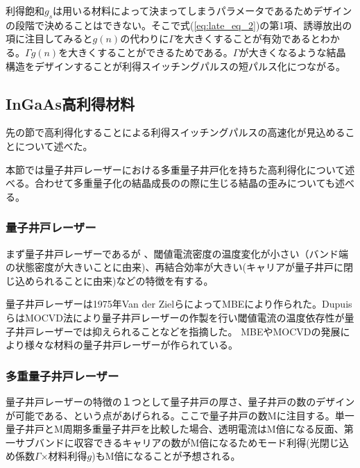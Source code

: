 利得飽和$g_{s}$は用いる材料によって決まってしまうパラメータであるためデザインの段階で決めることはできない。そこで式(\ref{eq:late_eq_2})の第1項、誘導放出の項に注目してみると$g(n)$の代わりに$\Gamma$を大きくすることが有効であるとわかる。$\Gamma g(n)$を大きくすることができるためである。$\Gamma$が大きくなるような結晶構造をデザインすることが利得スイッチングパルスの短パルス化につながる。
\clearpage
\subsection{InGaAs高利得材料}
先の節で高利得化することによる利得スイッチングパルスの高速化が見込めることについて述べた。

本節では量子井戸レーザーにおける多重量子井戸化を持ちた高利得化について述べる。合わせて多重量子化の結晶成長のの際に生じる結晶の歪みについても述べる。
\subsubsection{量子井戸レーザー}
まず量子井戸レーザーであるが
、閾値電流密度の温度変化が小さい（バンド端の状態密度が大きいことに由来)、再結合効率が大きい(キャリアが量子井戸に閉じ込められることに由来)などの特徴を有する。


量子井戸レーザーは1975年Van der ZielらによってMBEにより作られた\cite{ref_van}。DupuisらはMOCVD法により量子井戸レーザーの作製を行い閾値電流の温度依存性が量子井戸レーザーでは抑えられることなどを指摘した\cite{ref_dupuis}。%
MBEやMOCVDの発展により様々な材料の量子井戸レーザーが作られている。
\subsubsection{多重量子井戸レーザー}
量子井戸レーザーの特徴の１つとして量子井戸の厚さ、量子井戸の数のデザインが可能である、という点があげられる。ここで量子井戸の数Mに注目する。単一量子井戸とM周期多重量子井戸を比較した場合、透明電流はM倍になる反面、第一サブバンドに収容できるキャリアの数がM倍になるためモード利得(光閉じ込め係数$\Gamma$×材料利得$g$)もM倍になることが予想される。

